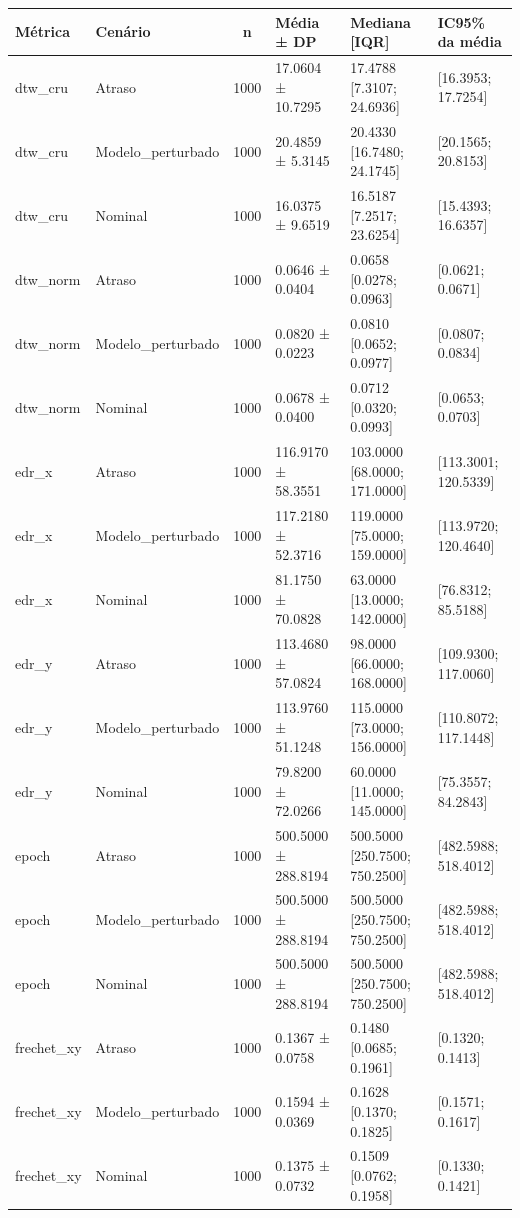 \begin{tabular}{llclll}
\toprule
Métrica & Cenário & n & Média ± DP & Mediana [IQR] & IC95\% da média \\
\midrule
dtw_cru & Atraso & 1000 & 17.0604 ± 10.7295 & 17.4788 [7.3107; 24.6936] & [16.3953; 17.7254] \\
dtw_cru & Modelo_perturbado & 1000 & 20.4859 ± 5.3145 & 20.4330 [16.7480; 24.1745] & [20.1565; 20.8153] \\
dtw_cru & Nominal & 1000 & 16.0375 ± 9.6519 & 16.5187 [7.2517; 23.6254] & [15.4393; 16.6357] \\
dtw_norm & Atraso & 1000 & 0.0646 ± 0.0404 & 0.0658 [0.0278; 0.0963] & [0.0621; 0.0671] \\
dtw_norm & Modelo_perturbado & 1000 & 0.0820 ± 0.0223 & 0.0810 [0.0652; 0.0977] & [0.0807; 0.0834] \\
dtw_norm & Nominal & 1000 & 0.0678 ± 0.0400 & 0.0712 [0.0320; 0.0993] & [0.0653; 0.0703] \\
edr_x & Atraso & 1000 & 116.9170 ± 58.3551 & 103.0000 [68.0000; 171.0000] & [113.3001; 120.5339] \\
edr_x & Modelo_perturbado & 1000 & 117.2180 ± 52.3716 & 119.0000 [75.0000; 159.0000] & [113.9720; 120.4640] \\
edr_x & Nominal & 1000 & 81.1750 ± 70.0828 & 63.0000 [13.0000; 142.0000] & [76.8312; 85.5188] \\
edr_y & Atraso & 1000 & 113.4680 ± 57.0824 & 98.0000 [66.0000; 168.0000] & [109.9300; 117.0060] \\
edr_y & Modelo_perturbado & 1000 & 113.9760 ± 51.1248 & 115.0000 [73.0000; 156.0000] & [110.8072; 117.1448] \\
edr_y & Nominal & 1000 & 79.8200 ± 72.0266 & 60.0000 [11.0000; 145.0000] & [75.3557; 84.2843] \\
epoch & Atraso & 1000 & 500.5000 ± 288.8194 & 500.5000 [250.7500; 750.2500] & [482.5988; 518.4012] \\
epoch & Modelo_perturbado & 1000 & 500.5000 ± 288.8194 & 500.5000 [250.7500; 750.2500] & [482.5988; 518.4012] \\
epoch & Nominal & 1000 & 500.5000 ± 288.8194 & 500.5000 [250.7500; 750.2500] & [482.5988; 518.4012] \\
frechet_xy & Atraso & 1000 & 0.1367 ± 0.0758 & 0.1480 [0.0685; 0.1961] & [0.1320; 0.1413] \\
frechet_xy & Modelo_perturbado & 1000 & 0.1594 ± 0.0369 & 0.1628 [0.1370; 0.1825] & [0.1571; 0.1617] \\
frechet_xy & Nominal & 1000 & 0.1375 ± 0.0732 & 0.1509 [0.0762; 0.1958] & [0.1330; 0.1421] \\

\end{tabular}

